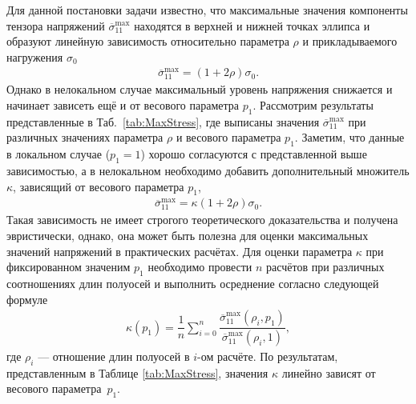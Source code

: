 Для данной постановки задачи известно, что максимальные значения компоненты тензора напряжений $\overline{\sigma}_{11}^{\max}$ находятся в верхней и нижней точках эллипса и образуют линейную зависимость относительно параметра $\rho$ и прикладываемого нагружения $\sigma_0$ \cite{Birger, Bezuh}
\begin{gather*}
	\overline{\sigma}_{11}^{\max} = \left( 1 + 2 \rho \right) \sigma_0.
\end{gather*}
Однако в нелокальном случае максимальный уровень напряжения снижается и начинает зависеть ещё и от весового параметра $p_1$. Рассмотрим результаты представленные в \mbox{Таб. \ref{tab:MaxStress}}, где выписаны значения $\overline{\sigma}_{11}^{\max}$ при различных значениях параметра $\rho$ и весового параметра $p_1$. Заметим, что данные в локальном случае ($p_1 = 1$) хорошо согласуются с представленной выше зависимостью, а в нелокальном необходимо добавить дополнительный множитель $\kappa$, зависящий от весового параметра $p_1$,
\begin{gather*}
	\overline{\sigma}_{11}^{\max} = \kappa \left( 1 + 2 \rho \right) \sigma_0.
\end{gather*}
Такая зависимость не имеет строгого теоретического доказательства и получена эвристически, однако, она может быть полезна для оценки максимальных значений напряжений в практических расчётах. Для оценки параметра $\kappa$ при фиксированном значеним $p_1$ необходимо провести $n$ расчётов при различных соотношениях длин полуосей и выполнить осреднение согласно следующей формуле
\begin{gather}
	\label{eq:Averaging}
	\kappa (p_1) = \dfrac{1}{n} \sum\limits_{i = 0}^{n} \dfrac{\overline{\sigma}_{11}^{\max} (\rho_i, p_1)}{\overline{\sigma}_{11}^{\max} (\rho_i, 1)},
\end{gather}
где $\rho_i$ --- отношение длин полуосей в $i$-ом расчёте. По результатам, представленным в Таблице \ref{tab:MaxStress}, значения $\kappa$ линейно зависят от весового параметра~$p_1$.

